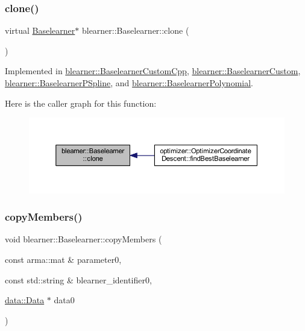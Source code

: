 \subsubsection{\texorpdfstring{clone()}{clone()}}
{\footnotesize\ttfamily virtual \mbox{\hyperlink{classblearner_1_1_baselearner}{Baselearner}}$\ast$ blearner\+::\+Baselearner\+::clone (\begin{DoxyParamCaption}{ }\end{DoxyParamCaption})\hspace{0.3cm}{\ttfamily [pure virtual]}}



Implemented in \mbox{\hyperlink{classblearner_1_1_baselearner_custom_cpp_a8478407ac4d8ed118fd1381f65df150a}{blearner\+::\+Baselearner\+Custom\+Cpp}}, \mbox{\hyperlink{classblearner_1_1_baselearner_custom_a1442790658c7ad08832a94fbc60ff94a}{blearner\+::\+Baselearner\+Custom}}, \mbox{\hyperlink{classblearner_1_1_baselearner_p_spline_aea7d3c0ef6d77ffb8a2fb2000fae6399}{blearner\+::\+Baselearner\+P\+Spline}}, and \mbox{\hyperlink{classblearner_1_1_baselearner_polynomial_a4afd811448bd6d387b721cc48b84da26}{blearner\+::\+Baselearner\+Polynomial}}.

Here is the caller graph for this function\+:\nopagebreak
\begin{figure}[H]
\begin{center}
\leavevmode
\includegraphics[width=350pt]{classblearner_1_1_baselearner_a8e12c6739f085917a7d2da6570c51a21_icgraph}
\end{center}
\end{figure}
\mbox{\label{classblearner_1_1_baselearner_ae8f114ca7c497f03c80de5981c7f811d}} 
\subsubsection{\texorpdfstring{copy\+Members()}{copyMembers()}}
{\footnotesize\ttfamily void blearner\+::\+Baselearner\+::copy\+Members (\begin{DoxyParamCaption}\item[{const arma\+::mat \&}]{parameter0,  }\item[{const std\+::string \&}]{blearner\+\_\+identifier0,  }\item[{\mbox{\hyperlink{classdata_1_1_data}{data\+::\+Data}} $\ast$}]{data0 }\end{DoxyParamCaption})}

